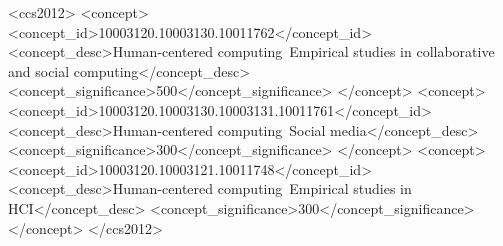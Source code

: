 \documentclass[sigconf, anonymous, review, balance=false]{acmart}
\begin{document}
\begin{abstract}
\end{abstract}

\begin{CCSXML}
<ccs2012>
   <concept>
       <concept_id>10003120.10003130.10011762</concept_id>
       <concept_desc>Human-centered computing~Empirical studies in collaborative and social computing</concept_desc>
       <concept_significance>500</concept_significance>
       </concept>
   <concept>
       <concept_id>10003120.10003130.10003131.10011761</concept_id>
       <concept_desc>Human-centered computing~Social media</concept_desc>
       <concept_significance>300</concept_significance>
       </concept>
  <concept>
       <concept_id>10003120.10003121.10011748</concept_id>
       <concept_desc>Human-centered computing~Empirical studies in HCI</concept_desc>
       <concept_significance>300</concept_significance>
       </concept>
 </ccs2012>
\end{CCSXML}



\end{document}
